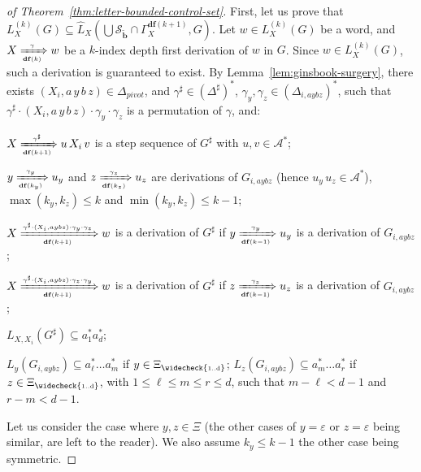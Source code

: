 \documentclass[final]{llncs}
\newcommand{\xArrow}[2]{\xRightarrow[{\scriptscriptstyle #2}]{{\scriptscriptstyle #1}}}
\def\prod{\Delta}
\def\patt{{\widetilde{\mathbf{b}}}}
\def\df#1{\scriptscriptstyle\mathbf{df}(#1)}
\def\Vars{\ensuremath{\Xi}}
\def\Varsi{\ensuremath{\Xi_{\widecheck{\text{\tiny 1..d}}}}}
\begin{document}
\begin{proof}[of Theorem~\ref{thm:letter-bounded-control-set}]
First, let us prove that
$L_X^{(k)}(G) \subseteq \hat{L}_X(\bigcup\mathcal{S}_\patt \cap
\Gamma_{X}^{\df{k+1}}, G)$. Let $w \in L_X^{(k)}(G)$ be a word, and $X
\xArrow{\gamma}{\df{k}} w$ be a $k$-index depth first derivation
of $w$ in $G$. Since $w \in L_X^{(k)}(G)$, such a derivation is
guaranteed to exist. By Lemma~\ref{lem:ginsbook-surgery}, there
exists $(X_i, a\, y\, b\, z) \in \prod_{pivot}$, and $\gamma^\sharp \in
(\prod^\sharp)^*$, $\gamma_{y},\gamma_{z} \in (\Delta_{i,aybz})^*$, such
that \(\gamma^\sharp \cdot (X_i,a\, y\, b\, z) \cdot \gamma_y \cdot \gamma_z\) is
a permutation of \(\gamma\), and:
\begin{compactitem}
	\item \(X \xArrow{\gamma^\sharp}{\df{k+1}} u\, X_i\, v\) is a
		step sequence of \({G^\sharp}\) with \(u, v\in \mathcal{A}^*\);

	\item \(y \xArrow{\gamma_{y}}{\df{k_y}} u_y\) and \(z
		\xArrow{\gamma_{z}}{\df{k_z}} u_z\) are derivations of
		\(G_{i,aybz}\) (hence  \(u_y\, u_z \in \mathcal{A}^* \)), 
                \(\max(k_y,k_z)\leq k\) and \(\min(k_y,k_z)\leq k-1\);

	\item \(X \xArrow{\gamma^\sharp \cdot (X_i,aybz) \cdot \gamma_y \cdot \gamma_z}{\df{k+1}} w\) 
              is a derivation of \({G^\sharp}\) if \(y \xArrow{\gamma_y}{\df{k-1}} u_y\) is a derivation of \({G_{i,aybz}}\); 
        
        \item \(X \xArrow{\gamma^\sharp \cdot (X_i,aybz) \cdot \gamma_z \cdot \gamma_y}{\df{k+1}} w\) 
              is a derivation of \({G^\sharp}\) if \(z \xArrow{\gamma_z}{\df{k-1}} u_z\) is a derivation of \({G_{i,aybz}}\); 

	\item \(L_{X,X_i}(G^\sharp) \subseteq a_1^*a_d^*\);

	\item \(L_{y}(G_{i,aybz}) \subseteq a_{\ell}^* \ldots a_{m}^*\) if \(y \in \Varsi\); 
              \(L_{z}(G_{i,aybz}) \subseteq a_{m}^* \ldots a_{r}^*\) if \(z \in \Varsi\), with
		\(1\leq \ell \leq m \leq r \leq d\), such that \( m-\ell < d - 1\)
		and \( r-m < d - 1\).
\end{compactitem}
Let us consider the case where $y,z \in \Vars$ (the other cases of
$y=\varepsilon$ or $z=\varepsilon$ being similar, are left to the reader). 
We also assume \(k_y \leq k-1\) the other case being symmetric.


\end{proof}
\end{document}
